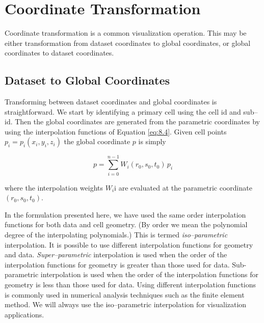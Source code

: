 \section{Coordinate Transformation}

Coordinate transformation is a common visualization operation. This may be either transformation from dataset coordinates to global coordinates, or global coordinates to dataset coordinates.

\subsection{Dataset to Global Coordinates}

Transforming between dataset coordinates and global coordinates is straightforward. We start by identifying a primary cell using the cell id and sub--id. Then the global coordinates are generated from the parametric coordinates by using the interpolation functions of Equation \ref{eq:8.4}. Given cell points $p_i = p_i(x_i, y_i, z_i)$ the global coordinate $p$ is simply

\begin{equation}\label{eq:8.8}
p = \sum_{i = 0}^{n - 1} W_i(r_0, s_0, t_0)\, p_i
\end{equation}

where the interpolation weights $W_i$i are evaluated at the parametric coordinate $(r_0, s_0, t_0)$.

In the formulation presented here, we have used the same order interpolation functions for both data and cell geometry. (By order we mean the polynomial degree of the interpolating polynomials.) This is termed \emph{iso--parametric} interpolation. It is possible to use different interpolation functions for geometry and data. \emph{Super--parametric} interpolation is used when the order of the interpolation functions for geometry is greater than those used for data. Sub-parametric interpolation is used when the order of the interpolation functions for geometry is less than those used for data. Using different interpolation functions is commonly used in numerical analysis techniques such as the finite element method. We will always use the iso--parametric interpolation for visualization applications.

